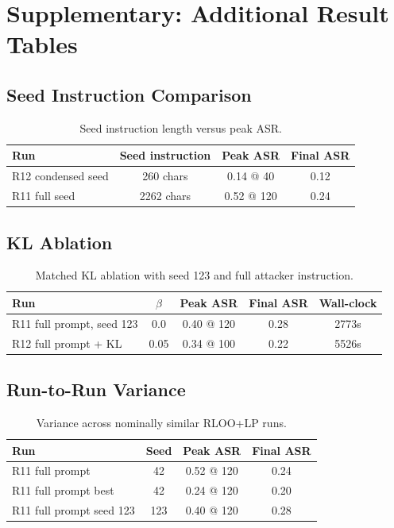 \section{Supplementary: Additional Result Tables}

\subsection{Seed Instruction Comparison}

\begin{table}[h]
\centering
\caption{Seed instruction length versus peak ASR.}
\label{tab:seed}
\begin{tabular}{lccc}
\toprule
Run & Seed 
instruction & Peak ASR & Final ASR \\
\midrule
R12 condensed seed & 260 chars & 0.14 @ 40 & 0.12 \\
R11 full seed & 2262 chars & 0.52 @ 120 & 0.24 \\
\bottomrule
\end{tabular}
\end{table}

\subsection{KL Ablation}

\begin{table}[H]
\centering
\caption{Matched KL ablation with seed 123 and full attacker instruction.}
\label{tab:kl}
\begin{tabular}{lcccc}
\toprule
Run & $\beta$ & Peak ASR & Final ASR & Wall-clock \\
\midrule
R11 full prompt, seed 123 & 0.0 & 0.40 @ 120 & 0.28 & 2773s \\
R12 full prompt + KL & 0.05 & 0.34 @ 100 & 0.22 & 5526s \\
\bottomrule
\end{tabular}
\end{table}

\subsection{Run-to-Run Variance}

\begin{table}[H]
\centering
\caption{Variance across nominally similar RLOO+LP runs.}
\label{tab:variance}
\begin{tabular}{lccc}
\toprule
Run & Seed & Peak ASR & Final ASR \\
\midrule
R11 full prompt & 42 & 0.52 @ 120 & 0.24 \\
R11 full prompt best & 42 & 0.24 @ 120 & 0.20 \\
R11 full prompt seed 123 & 123 & 0.40 @ 120 & 0.28 \\
\bottomrule
\end{tabular}
\end{table}

